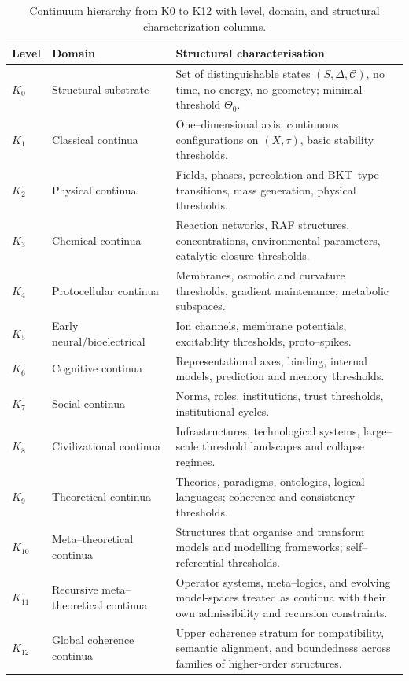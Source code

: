 \begin{octablescope}
\begin{longtable}{@{}L{0.08\textwidth}L{0.18\textwidth}L{0.58\textwidth}@{}}
\caption{Continuum hierarchy from K0 to K12 with level, domain, and structural characterization columns.}\label{tab:klevels-overview}\\
\toprule
    Level & Domain & Structural characterisation \\
    \midrule
    \(K_0\) & Structural substrate &
      Set of distinguishable states \((S,\Delta,\mathcal{C})\), no time,
      no energy, no geometry; minimal threshold \(\Theta_0\). \\[0.3em]
    \(K_1\) & Classical continua &
      One--dimensional axis, continuous configurations on \((X,\tau)\),
      basic stability thresholds. \\[0.3em]
    \(K_2\) & Physical continua &
      Fields, phases, percolation and BKT--type transitions, mass
      generation, physical thresholds. \\[0.3em]
    \(K_3\) & Chemical continua &
      Reaction networks, RAF structures, concentrations, environmental
      parameters, catalytic closure thresholds. \\[0.3em]
    \(K_4\) & Protocellular continua &
      Membranes, osmotic and curvature thresholds, gradient maintenance,
      metabolic subspaces. \\[0.3em]
    \(K_5\) & Early neural/bioelectrical &
      Ion channels, membrane potentials, excitability thresholds, proto--spikes. \\[0.3em]
    \(K_6\) & Cognitive continua &
      Representational axes, binding, internal models, prediction and
      memory thresholds. \\[0.3em]
    \(K_7\) & Social continua &
      Norms, roles, institutions, trust thresholds, institutional cycles. \\[0.3em]
    \(K_8\) & Civilizational continua &
      Infrastructures, technological systems, large--scale threshold
      landscapes and collapse regimes. \\[0.3em]
    \(K_9\) & Theoretical continua &
      Theories, paradigms, ontologies, logical languages; coherence and
      consistency thresholds. \\[0.3em]
    \(K_{10}\) & Meta--theoretical continua &
      Structures that organise and transform models and modelling
      frameworks; self--referential thresholds. \\[0.3em]
    \(K_{11}\) & Recursive meta--theoretical continua &
      Operator systems, meta--logics, and evolving model-spaces treated as
      continua with their own admissibility and recursion constraints. \\[0.3em]
    \(K_{12}\) & Global coherence continua &
      Upper coherence stratum for compatibility, semantic alignment, and
      boundedness across families of higher-order structures. \\
    \bottomrule
\end{longtable}
\end{octablescope}

